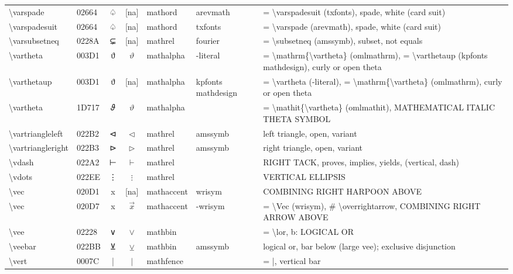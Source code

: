 \documentclass[a4paper,landscape]{article}
\begin{document}
\begin{longtable}{llcclll}
\textbackslash{}varspade & 02664 & ♤ & [na] & mathord & arevmath & = \textbackslash{}varspadesuit (txfonts),  spade,  white (card suit) \\
\textbackslash{}varspadesuit & 02664 & ♤ & [na] & mathord & txfonts & = \textbackslash{}varspade (arevmath), spade, white (card suit) \\
\textbackslash{}varsubsetneq & 0228A & ⊊ & [na] & mathrel & fourier & = \textbackslash{}subsetneq (amssymb),  subset,  not equals \\
\textbackslash{}vartheta & 003D1 & ϑ & $\vartheta$ & mathalpha & -literal & = \textbackslash{}mathrm\{\textbackslash{}vartheta\} (omlmathrm), = \textbackslash{}varthetaup (kpfonts mathdesign), curly or open theta \\
\textbackslash{}varthetaup & 003D1 & ϑ & [na] & mathalpha & kpfonts mathdesign & = \textbackslash{}vartheta (-literal), = \textbackslash{}mathrm\{\textbackslash{}vartheta\} (omlmathrm),  curly or open theta \\
\textbackslash{}vartheta & 1D717 & 𝜗 & $\vartheta$ & mathalpha &  & = \textbackslash{}mathit\{\textbackslash{}vartheta\} (omlmathit), MATHEMATICAL ITALIC THETA SYMBOL \\
\textbackslash{}vartriangleleft & 022B2 & ⊲ & $\vartriangleleft$ & mathrel & amssymb & left triangle, open, variant \\
\textbackslash{}vartriangleright & 022B3 & ⊳ & $\vartriangleright$ & mathrel & amssymb & right triangle, open, variant \\
\textbackslash{}vdash & 022A2 & ⊢ & $\vdash$ & mathrel &  & RIGHT TACK, proves, implies, yields, (vertical, dash) \\
\textbackslash{}vdots & 022EE & ⋮ & $\vdots$ & mathrel &  & VERTICAL ELLIPSIS \\
\textbackslash{}vec & 020D1 & x⃑ & [na] & mathaccent & wrisym & COMBINING RIGHT HARPOON ABOVE \\
\textbackslash{}vec & 020D7 & x⃗ & $\vec{x}$ & mathaccent & -wrisym & = \textbackslash{}Vec (wrisym), \# \textbackslash{}overrightarrow, COMBINING RIGHT ARROW ABOVE \\
\textbackslash{}vee & 02228 & ∨ & $\vee$ & mathbin &  & = \textbackslash{}lor, b: LOGICAL OR \\
\textbackslash{}veebar & 022BB & ⊻ & $\veebar$ & mathbin & amssymb & logical or, bar below (large vee); exclusive disjunction \\
\textbackslash{}vert & 0007C & | & $\vert$ & mathfence &  & = |,  vertical bar \\

\end{longtable}
\end{document}

